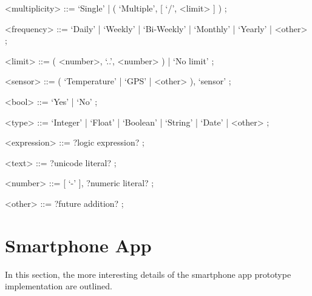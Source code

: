 \begin{grammar}
      <multiplicity> ::= `Single' | ( `Multiple', {[} `/', <limit> {]} ) ;
      
      <frequency> ::= `Daily' | `Weekly' | `Bi-Weekly' | `Monthly' | `Yearly' | <other> ;
      
      <limit> ::= ( <number>, `..', <number> ) | `No limit' ;
      
      <sensor> ::= ( `Temperature' | `GPS' | <other> ), `sensor' ;
      
      <bool> ::= `Yes' | `No' ;
      
      <type> ::= `Integer' | `Float' | `Boolean' | `String' | `Date' | <other> ;
      
      <expression> ::= ?logic expression? ;
      
      <text> ::= ?unicode literal? ;
      
      <number> ::= {[} `-' {]}, ?numeric literal? ;
      
      <other> ::= ?future addition? ;
\end{grammar}

\section{Smartphone App}
\label{sec:app}
In this section, the more interesting details of the smartphone app prototype implementation are outlined.
